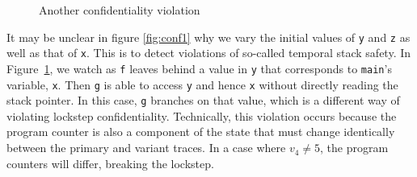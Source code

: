 \documentclass[acmsmall,review,anonymous]{acmart}\settopmatter{printfolios=true,printccs=false,printacmref=false}
\begin{document}
\begin{figure}
\begin{subfigure}{.65\textwidth}
\vspace{\abovedisplayskip}

\end{subfigure}

\caption{Another confidentiality violation }
\label{fig:conf2}
\end{figure}

It may be unclear in figure \ref{fig:conf1} why we vary the initial values of {\tt y}
and {\tt z} as well as that of {\tt x}. This is to detect violations of so-called
temporal stack safety.
In Figure~\ref{fig:conf2}, we watch as {\tt f} leaves behind a value in {\tt y}
that corresponds to {\tt main}'s variable, {\tt x}. Then {\tt g} is able to access
{\tt y} and hence {\tt x} without directly reading the stack pointer. In
this case, {\tt g} branches on that value, which is a different way of
violating lockstep confidentiality. Technically, this violation
occurs because the program counter is also a component of the state that must change
identically between the primary and variant traces. In a case where \(v_4 \not = 5\),
the program counters will differ, breaking the lockstep.
\end{document}
